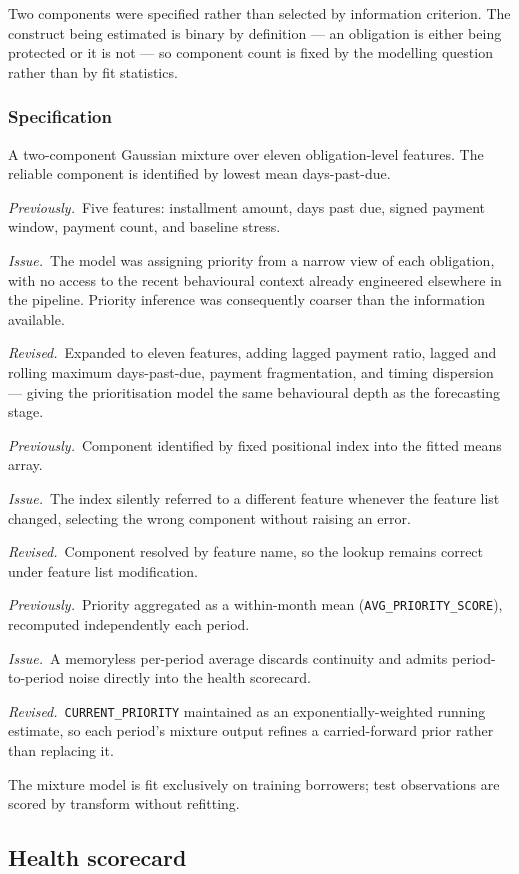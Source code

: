 \documentclass[11pt,a4paper]{article}
\newcommand{\designnote}[3]{%
  \par\vspace{7pt}
  \begin{list}{}{%
    \setlength{\leftmargin}{2em}\setlength{\rightmargin}{1em}%
    \setlength{\labelwidth}{0pt}\setlength{\labelsep}{0pt}%
    \setlength{\itemsep}{2pt}\setlength{\topsep}{0pt}%
    \setlength{\parsep}{0pt}}
    \item[]\textit{Previously.}~#1
    \item[]\textit{Issue.}~#2
    \item[]\textit{Revised.}~#3
  \end{list}
  \par\vspace{7pt}
}
\begin{document}
Two components were specified rather than selected by information criterion. The
construct being estimated is binary by definition --- an obligation is either being
protected or it is not --- so component count is fixed by the modelling question rather
than by fit statistics.

\subsubsection*{Specification}

A two-component Gaussian mixture over eleven obligation-level features. The reliable
component is identified by lowest mean days-past-due.

\designnote{Five features: installment amount, days past due, signed payment window,
payment count, and baseline stress.}
{The model was assigning priority from a narrow view of each obligation, with no access
to the recent behavioural context already engineered elsewhere in the pipeline. Priority
inference was consequently coarser than the information available.}
{Expanded to eleven features, adding lagged payment ratio, lagged and rolling maximum
days-past-due, payment fragmentation, and timing dispersion --- giving the prioritisation
model the same behavioural depth as the forecasting stage.}

\designnote{Component identified by fixed positional index into the fitted means array.}
{The index silently referred to a different feature whenever the feature list changed,
selecting the wrong component without raising an error.}
{Component resolved by feature name, so the lookup remains correct under feature list
modification.}

\designnote{Priority aggregated as a within-month mean
(\texttt{AVG\_PRIORITY\_SCORE}), recomputed independently each period.}
{A memoryless per-period average discards continuity and admits period-to-period noise
directly into the health scorecard.}
{\texttt{CURRENT\_PRIORITY} maintained as an exponentially-weighted running estimate, so
each period's mixture output refines a carried-forward prior rather than replacing it.}

The mixture model is fit exclusively on training borrowers; test observations are scored
by transform without refitting.

\subsection{Health scorecard}
\end{document}
